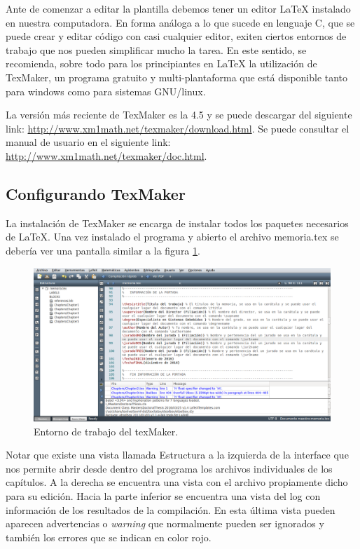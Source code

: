 Ante de comenzar a editar la plantilla debemos tener un editor \LaTeX{} instalado en nuestra computadora.  En forma análoga a lo que sucede en lenguaje C, que se puede crear y editar código con casi cualquier editor, exiten ciertos entornos de trabajo que nos pueden simplificar mucho la tarea.  En este sentido, se recomienda, sobre todo para los principiantes en \LaTeX{} la utilización de TexMaker, un programa gratuito y multi-plantaforma que está disponible tanto para windows como para sistemas GNU/linux.

La versión más reciente de TexMaker es la 4.5 y se puede descargar del siguiente link: \url{http://www.xm1math.net/texmaker/download.html}. Se puede consultar el manual de usuario en el siguiente link: \url{http://www.xm1math.net/texmaker/doc.html}.

\subsection{Configurando TexMaker}

La instalación de TexMaker se encarga de instalar todos los paquetes necesarios de \LaTeX{}. 
Una vez instalado el programa y abierto el archivo memoria.tex se debería ver una pantalla similar a la figura \ref{fig:texmaker}. 

\begin{figure}[h]
	\centering
	\includegraphics[width=\textwidth]{./Figures/texmaker.png}
	\caption{Entorno de trabajo del texMaker.}
	\label{fig:texmaker}
\end{figure}

Notar que existe una vista llamada Estructura a la izquierda de la interface que nos permite abrir desde dentro del programa los archivos individuales de los capítulos.  A la derecha se encuentra una vista con el archivo propiamente dicho para su edición. Hacia la parte inferior se encuentra una vista del log con información de los resultados de la compilación.  En esta última vista pueden aparecen advertencias o \textit{warning} que normalmente pueden ser ignorados y también los errores que se indican en color rojo.

